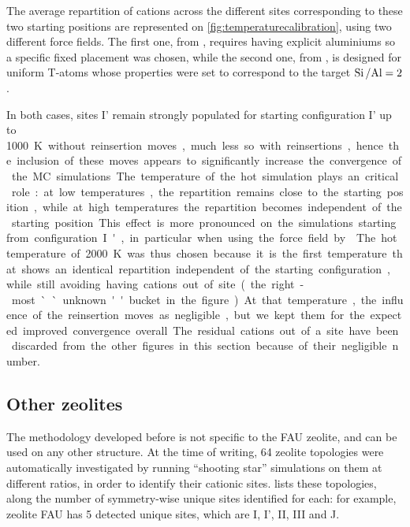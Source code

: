 \documentclass[main.tex]{subfiles}
\begin{document}
The average repartition of cations across the different sites corresponding to these two starting positions are represented on \cref{fig:temperaturecalibration}, using two different force fields. The first one, from \textcite{BoulfelfelSholl2021}, requires having explicit aluminiums so a specific fixed placement was chosen, while the second one, from \textcite{DiLellaFF}, is designed for uniform T-atoms whose properties were set to correspond to the target $\mbox{Si\,/Al} = 2$.

In both cases, sites I' remain strongly populated for starting configuration I' up to \qty{1000}K without reinsertion moves, much less so with reinsertions, hence the inclusion of these moves appears to significantly increase the convergence of the MC simulations.

The temperature of the hot simulation plays an critical role: at low temperatures, the repartition remains close to the starting position, while at high temperatures the repartition becomes independent of the starting position. This effect is more pronounced on the simulations starting from configuration I', in particular when using the force field by \textcite{DiLellaFF}. The hot temperature of \qty{2000}K was thus chosen because it is the first temperature that shows an identical repartition independent of the starting configuration, while still avoiding having cations out of site (the right-most ``unknown'' bucket in the figure). At that temperature, the influence of the reinsertion moves as negligible, but we kept them for the expected improved convergence overall. The residual cations out of a site have been discarded from the other figures in this section because of their negligible number.


\subsection{Other zeolites}

The methodology developed before is not specific to the FAU zeolite, and can be used on any other structure. At the time of writing, 64 zeolite topologies were automatically investigated by running ``shooting star'' simulations on them at different \SiAl ratios, in order to identify their cationic sites.  lists these topologies, along the number of symmetry-wise unique sites identified for each: for example, zeolite FAU has 5 detected unique sites, which are I, I', II, III and J.
\end{document}
